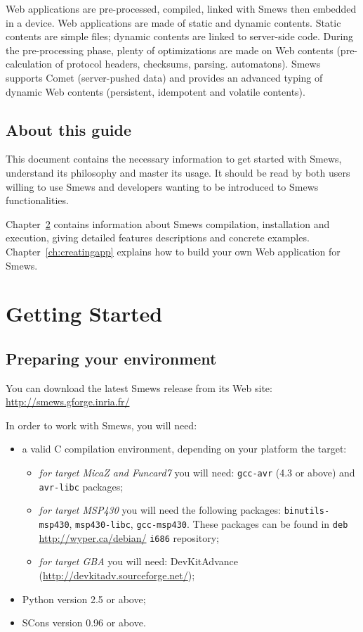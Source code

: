 \documentclass{report}
\newcommand{\rchap}[1]{Chapter~\ref{ch:#1}}
\begin{document}
Web applications are pre-processed, compiled, linked with Smews then embedded in a device. Web applications are made of static and dynamic contents. Static contents are simple files; dynamic contents are linked to server-side code. During the pre-processing phase, plenty of optimizations are made on Web contents (pre-calculation of protocol headers, checksums, parsing. automatons). Smews supports Comet (server-pushed data) and provides an advanced typing of dynamic Web contents (persistent, idempotent and volatile contents).

\section{About this guide}

This document contains the necessary information to get started with Smews, understand its philosophy and master its usage. It should be read by both users willing to use Smews and developers wanting to be introduced to Smews functionalities.

\rchap{gettingstarted} contains information about Smews compilation, installation and execution, giving detailed features descriptions and concrete examples. \rchap{creatingapp} explains how to build your own Web application for Smews.

\chapter{Getting Started}
\label{ch:gettingstarted}

\section{Preparing your environment}

You can download the latest Smews release from its Web site: \url{http://smews.gforge.inria.fr/}

In order to work with Smews, you will need:
\begin{itemize}
  \item a valid C compilation environment, depending on your platform the target:
	\begin{itemize}
	  \item \emph{for target MicaZ and Funcard7} you will need: \verb+gcc-avr+  (4.3 or above) and \verb+avr-libc+ packages;
	  \item \emph{for target MSP430} you will need the following packages: \verb+binutils-msp430+, \verb+msp430-libc+, \verb+gcc-msp430+. These packages can be found in \verb+deb+ \url{http://wyper.ca/debian/} \verb+i686+ repository;
	  \item \emph{for target GBA} you will need: DevKitAdvance (\url{http://devkitadv.sourceforge.net/});
	\end{itemize}
  \item Python version 2.5 or above;
  \item SCons version 0.96 or above.
\end{itemize}
\end{document}
